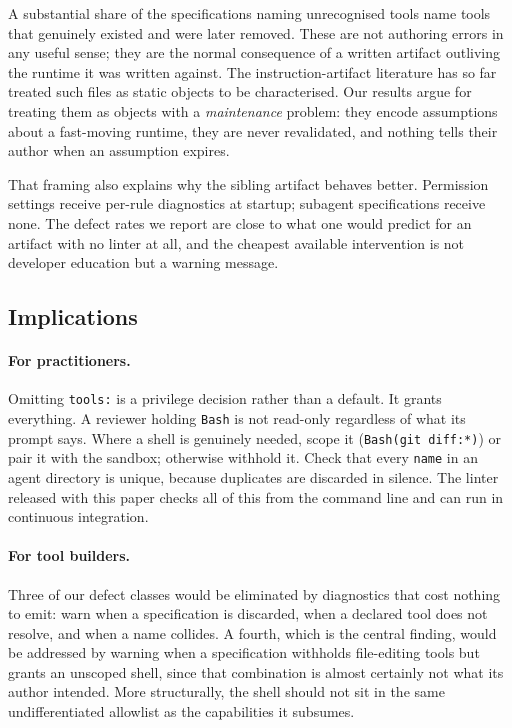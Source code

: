 \documentclass[smallextended,natbib]{svjour3}
\newcommand{\code}[1]{\texttt{\small #1}}
\begin{document}
A substantial share of the specifications naming unrecognised tools name tools that genuinely
existed and were later removed. These are not authoring errors in any useful sense; they are the
normal consequence of a written artifact outliving the runtime it was written against. The
instruction-artifact literature has so far treated such files as static objects to be characterised.
Our results argue for treating them as objects with a \emph{maintenance} problem: they encode
assumptions about a fast-moving runtime, they are never revalidated, and nothing tells their author
when an assumption expires.

That framing also explains why the sibling artifact behaves better. Permission settings receive
per-rule diagnostics at startup; subagent specifications receive none. The defect rates we report are
close to what one would predict for an artifact with no linter at all, and the cheapest available
intervention is not developer education but a warning message.

\subsection{Implications}

\paragraph{For practitioners.} Omitting \code{tools:} is a privilege decision rather than a default. It
grants everything. A reviewer holding \code{Bash} is not read-only regardless of what its prompt says.
Where a shell is genuinely needed, scope it (\code{Bash(git diff:*)}) or pair it with the sandbox;
otherwise withhold it. Check that every \code{name} in an agent directory is unique, because
duplicates are discarded in silence. The linter released with this paper checks all of this from the
command line and can run in continuous integration.

\paragraph{For tool builders.} Three of our defect classes would be eliminated by diagnostics that
cost nothing to emit: warn when a specification is discarded, when a declared tool does not resolve,
and when a name collides. A fourth, which is the central finding, would be addressed by warning when a
specification withholds file-editing tools but grants an unscoped shell, since that combination is
almost certainly not what its author intended. More structurally, the shell should not sit in the
same undifferentiated allowlist as the capabilities it subsumes.
\end{document}
